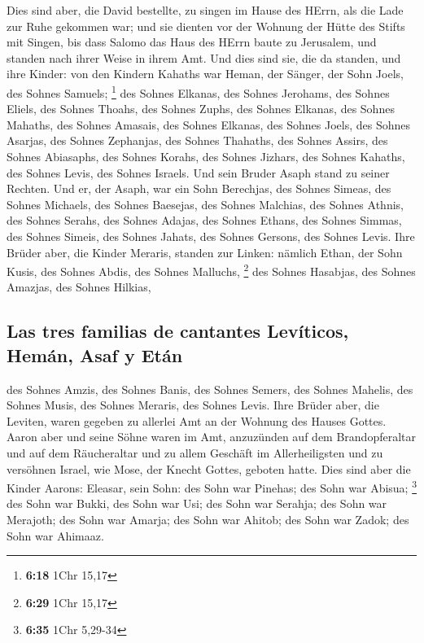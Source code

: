  Dies sind aber, die David bestellte, zu singen im Hause
des HErrn, als die Lade zur Ruhe gekommen war;  und sie
dienten vor der Wohnung der Hütte des Stifts mit Singen, bis dass Salomo
das Haus des HErrn baute zu Jerusalem, und standen nach ihrer Weise in
ihrem Amt.  Und dies sind sie, die da standen, und ihre
Kinder: von den Kindern Kahaths war Heman, der Sänger, der Sohn Joels,
des Sohnes Samuels; \footnote{\textbf{6:18} 1Chr 15,17} 
des Sohnes Elkanas, des Sohnes Jerohams, des Sohnes Eliels, des Sohnes
Thoahs,  des Sohnes Zuphs, des Sohnes Elkanas, des Sohnes
Mahaths, des Sohnes Amasais,  des Sohnes Elkanas, des
Sohnes Joels, des Sohnes Asarjas, des Sohnes Zephanjas, 
des Sohnes Thahaths, des Sohnes Assirs, des Sohnes Abiasaphs, des Sohnes
Korahs,  des Sohnes Jizhars, des Sohnes Kahaths, des
Sohnes Levis, des Sohnes Israels.  Und sein Bruder Asaph
stand zu seiner Rechten. Und er, der Asaph, war ein Sohn Berechjas, des
Sohnes Simeas,  des Sohnes Michaels, des Sohnes Baesejas,
des Sohnes Malchias,  des Sohnes Athnis, des Sohnes
Serahs, des Sohnes Adajas,  des Sohnes Ethans, des Sohnes
Simmas, des Sohnes Simeis,  des Sohnes Jahats, des Sohnes
Gersons, des Sohnes Levis.  Ihre Brüder aber, die Kinder
Meraris, standen zur Linken: nämlich Ethan, der Sohn Kusis, des Sohnes
Abdis, des Sohnes Malluchs, \footnote{\textbf{6:29} 1Chr 15,17}
 des Sohnes Hasabjas, des Sohnes Amazjas, des Sohnes
Hilkias,

\hypertarget{las-tres-familias-de-cantantes-levuxedticos-hemuxe1n-asaf-y-etuxe1n}{%
\subsection{Las tres familias de cantantes Levíticos, Hemán, Asaf y
Etán}\label{las-tres-familias-de-cantantes-levuxedticos-hemuxe1n-asaf-y-etuxe1n}}

 des Sohnes Amzis, des Sohnes Banis, des Sohnes Semers,
 des Sohnes Mahelis, des Sohnes Musis, des Sohnes
Meraris, des Sohnes Levis.  Ihre Brüder aber, die
Leviten, waren gegeben zu allerlei Amt an der Wohnung des Hauses Gottes.
 Aaron aber und seine Söhne waren im Amt, anzuzünden auf
dem Brandopferaltar und auf dem Räucheraltar und zu allem Geschäft im
Allerheiligsten und zu versöhnen Israel, wie Mose, der Knecht Gottes,
geboten hatte.  Dies sind aber die Kinder Aarons:
Eleasar, sein Sohn: des Sohn war Pinehas; des Sohn war Abisua;
\footnote{\textbf{6:35} 1Chr 5,29-34}  des Sohn war
Bukki, des Sohn war Usi; des Sohn war Serahja;  des Sohn
war Merajoth; des Sohn war Amarja; des Sohn war Ahitob; 
des Sohn war Zadok; des Sohn war Ahimaaz.

